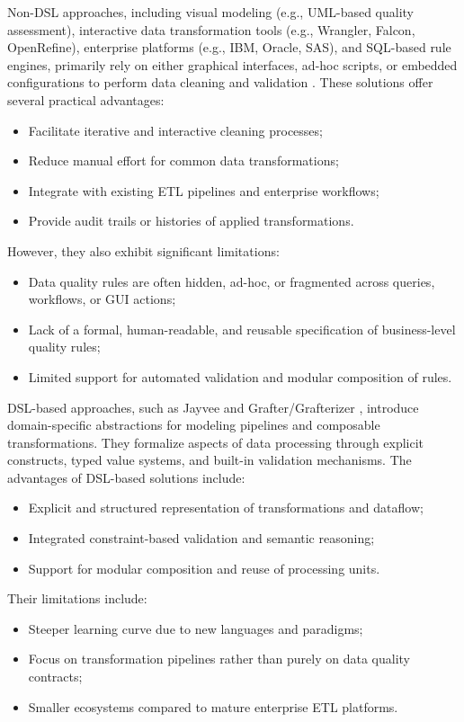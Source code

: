Non-DSL approaches, including visual modeling (e.g., UML-based quality assessment), interactive data transformation tools (e.g., Wrangler, Falcon, OpenRefine), enterprise platforms (e.g., IBM, Oracle, SAS), and SQL-based rule engines, primarily rely on either graphical interfaces, ad-hoc scripts, or embedded configurations to perform data cleaning and validation \cite{rahm2000data,wrangler,openrefine-site,falcon,quality-assessment-uml}. 
These solutions offer several practical advantages:
\begin{itemize}[label=-, noitemsep]
    \item Facilitate iterative and interactive cleaning processes;
    \item Reduce manual effort for common data transformations;
    \item Integrate with existing ETL pipelines and enterprise workflows;
    \item Provide audit trails or histories of applied transformations.
\end{itemize}
However, they also exhibit significant limitations:
\begin{itemize}[label=-, noitemsep]
    \item Data quality rules are often hidden, ad-hoc, or fragmented across queries, workflows, or GUI actions;
    \item Lack of a formal, human-readable, and reusable specification of business-level quality rules;
    \item Limited support for automated validation and modular composition of rules.
\end{itemize}

DSL-based approaches, such as Jayvee \cite{jayvee} and Grafter/Grafterizer \cite{grafterizer}, introduce domain-specific abstractions for modeling pipelines and composable transformations. 
They formalize aspects of data processing through explicit constructs, typed value systems, and built-in validation mechanisms. 
The advantages of DSL-based solutions include:
\begin{itemize}[label=-, noitemsep]
    \item Explicit and structured representation of transformations and dataflow;
    \item Integrated constraint-based validation and semantic reasoning;
    \item Support for modular composition and reuse of processing units.
\end{itemize}
Their limitations include:
\begin{itemize}[label=-, noitemsep]
    \item Steeper learning curve due to new languages and paradigms;
    \item Focus on transformation pipelines rather than purely on data quality contracts;
    \item Smaller ecosystems compared to mature enterprise ETL platforms.
\end{itemize}

